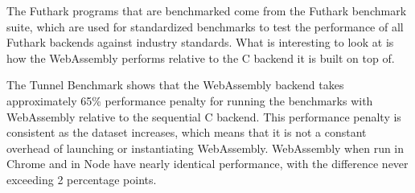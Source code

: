 \documentclass[11pt]{book}
\begin{document}
The Futhark programs that are benchmarked come from the Futhark benchmark suite, which are used for standardized benchmarks to test the performance of all Futhark backends against industry standards. What is interesting to look at is how the WebAssembly performs relative to the C backend it is built on top of.
\begin{table}[h!]
    \noindent{}
    \caption{Caption}
    \label{tab:my_label}
\end{table}

The Tunnel Benchmark shows that the WebAssembly backend takes approximately 65\% performance penalty for running the benchmarks with WebAssembly relative to the sequential C backend. This performance penalty is consistent as the dataset increases, which means that it is not a constant overhead of launching or instantiating WebAssembly. WebAssembly when run in Chrome and in Node have nearly identical performance, with the difference never exceeding 2 percentage points.

\begin{table}[h!]
    \noindent{}
    \caption{Caption}
    \label{tab:my_label}
\end{table}
\end{document}
